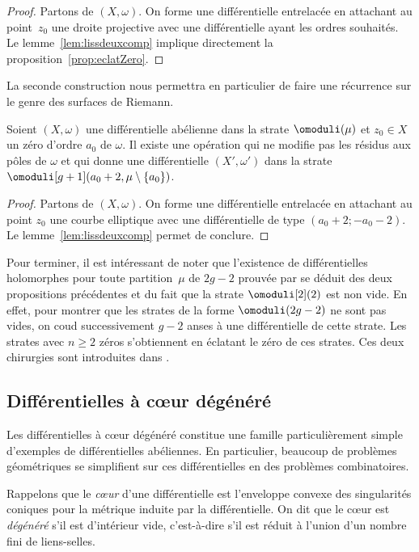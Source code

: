 \begin{proof}
Partons de $(X,\omega)$. On forme une différentielle entrelacée en attachant au point~$z_{0}$ une droite projective avec une différentielle ayant les ordres souhaités. Le lemme~\ref{lem:lissdeuxcomp} implique directement la proposition~\ref{prop:eclatZero}.
\end{proof}

La seconde construction nous permettra en particulier de faire une récurrence sur le genre des surfaces de Riemann.

\begin{prop}\label{prop:attachanse}
Soient $(X,\omega)$ une différentielle abélienne dans la strate $\omoduli(\mu)$ et $z_{0}\in X$ un zéro d'ordre $a_{0}$ de $\omega$.
Il existe une opération qui ne modifie pas les résidus aux pôles de $\omega$ et qui donne une différentielle $(X',\omega')$ dans la strate $\omoduli[g+1](a_{0}+2,\mu\setminus\left\{a_{0}\right\})$.
\end{prop}
\begin{proof}
Partons de $(X,\omega)$. On forme une différentielle entrelacée en attachant au point $z_{0}$ une courbe elliptique avec une différentielle de type $(a_{0}+2;-a_{0}-2)$. Le lemme~\ref{lem:lissdeuxcomp} permet de conclure.
\end{proof}

Pour terminer, il est intéressant de noter que l'existence de différentielles holomorphes pour toute partition~$\mu$ de $2g-2$ prouvée par \cite{masm} se déduit des deux propositions précédentes et du fait que la strate $\omoduli[2](2)$ est non vide. En effet, pour montrer que les strates de la forme $\omoduli(2g-2)$ ne sont pas vides, on coud successivement $g-2$ anses à une différentielle de cette strate. Les strates avec $n\geq2$ zéros s’obtiennent en éclatant le zéro de ces strates. Ces deux chirurgies sont introduites dans \cite[\S4.2]{kozo}.

\subsection{Différentielles à cœur dégénéré}
\label{sec:coeur}

Les différentielles à cœur dégénéré constitue une famille particulièrement simple d'exemples de différentielles abéliennes. En particulier, beaucoup de problèmes géométriques se simplifient sur ces différentielles en des problèmes combinatoires.

Rappelons que le \emph{cœur} d'une différentielle est l'enveloppe convexe des singularités coniques pour la métrique induite par la différentielle. On dit que le cœur est \textit{dégénéré} s'il est d'intérieur vide, c'est-à-dire s'il est réduit à l'union d'un nombre fini de liens-selles.

